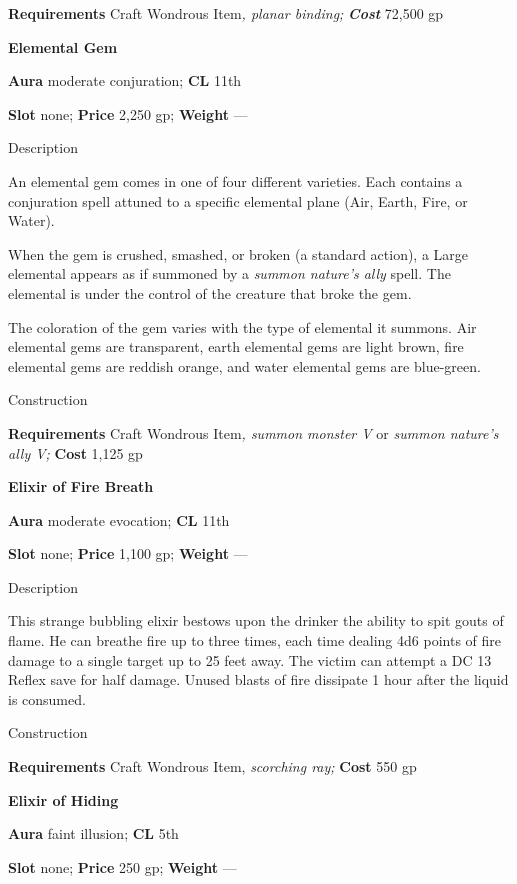 \textbf{Requirements} Craft Wondrous Item\textit{, planar binding;}\textbf{\textit{ Cost }}72,500 gp
				
\textbf{Elemental Gem}
				
\textbf{Aura} moderate conjuration;\textbf{ CL }11th
				
\textbf{Slot} none; \textbf{Price} 2,250 gp; \textbf{Weight }---
				
Description
				
An elemental gem comes in one of four different varieties. Each contains a conjuration spell attuned to a specific elemental plane (Air, Earth, Fire, or Water).
				
When the gem is crushed, smashed, or broken (a standard action), a Large elemental appears as if summoned by a\textit{ summon nature's ally} spell. The elemental is under the control of the creature that broke the gem.
				
The coloration of the gem varies with the type of elemental it summons. Air elemental gems are transparent, earth elemental gems are light brown, fire elemental gems are reddish orange, and water elemental gems are blue-green. 
				
Construction
				
\textbf{Requirements} Craft Wondrous Item\textit{, summon monster V} or \textit{summon nature's ally V;}\textbf{ Cost }1,125 gp
				
\textbf{Elixir of Fire Breath}
				
\textbf{Aura} moderate evocation;\textbf{ CL }11th
				
\textbf{Slot} none; \textbf{Price} 1,100 gp; \textbf{Weight }---
				
Description
				
This strange bubbling elixir bestows upon the drinker the ability to spit gouts of flame. He can breathe fire up to three times, each time dealing 4d6 points of fire damage to a single target up to 25 feet away. The victim can attempt a DC 13 Reflex save for half damage. Unused blasts of fire dissipate 1 hour after the liquid is consumed. 
				
Construction
				
\textbf{Requirements} Craft Wondrous Item, \textit{scorching ray;}\textbf{ Cost }550 gp
				
\textbf{Elixir of Hiding}
				
\textbf{Aura} faint illusion;\textbf{ CL }5th
				
\textbf{Slot} none; \textbf{Price} 250 gp; \textbf{Weight }---
				
